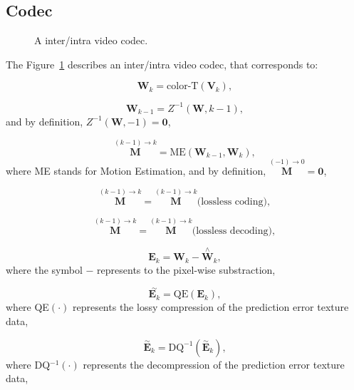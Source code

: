 \subsection{Codec}
\begin{figure}
  \centering
  \caption{A inter/intra video codec.}
\label{fig:IPP_codec}
\end{figure}

The Figure~\ref{fig:IPP_codec} describes an inter/intra video codec,
that corresponds to:

\begin{equation}
  {\mathbf W}_k = \text{color-T}({\mathbf V}_k),
  \tag{a}
\end{equation}

\begin{equation}
   {\mathbf W}_{k-1} = Z^{-1}({\mathbf W}, k-1),
  \tag{b}
\end{equation}
and by definition, $Z^{-1}({\mathbf W}, -1) = {\mathbf 0}$,

\begin{equation}
  \overset{(k-1)\rightarrow k}{\mathbf M} = \text{ME}({\mathbf W}_{k-1}, {\mathbf W}_k),
  \tag{c}
\end{equation}
where ME stands for Motion Estimation, and by definition,
$\overset{(-1)\rightarrow 0}{{\mathbf M}} = {\mathbf 0}$,

\begin{equation}
  \overset{(k-1)\rightarrow k}{\mathbf M} = \overset{(k-1)\rightarrow k}{\mathbf M} \text{(lossless~coding)},
  \tag{d}
\end{equation}

\begin{equation}
  \overset{(k-1)\rightarrow k}{\mathbf M} = \overset{(k-1)\rightarrow k}{\mathbf M} \text{(lossless~decoding)},
  \tag{e}
\end{equation}

\begin{equation}
  {\mathbf E}_k = {\mathbf W}_k - \overset{\wedge}{{\mathbf W}}_k,
  \tag{f}
\end{equation}
where the symbol $-$ represents to the pixel-wise substraction,

\begin{equation}
  \overset{\sim}{{\mathbf E}_k} = \text{QE}({\mathbf E}_k),
  \tag{g}
\end{equation}
where QE$(\cdot)$ represents the lossy compression of the
prediction error texture data,

\begin{equation}
  \overset{\sim}{\mathbf E}_k = \text{DQ}^{-1}(\overset{\sim}{\mathbf E}_k),
  \tag{h}
\end{equation}
where DQ$^{-1}(\cdot)$ represents the decompression of the prediction
error texture data,

